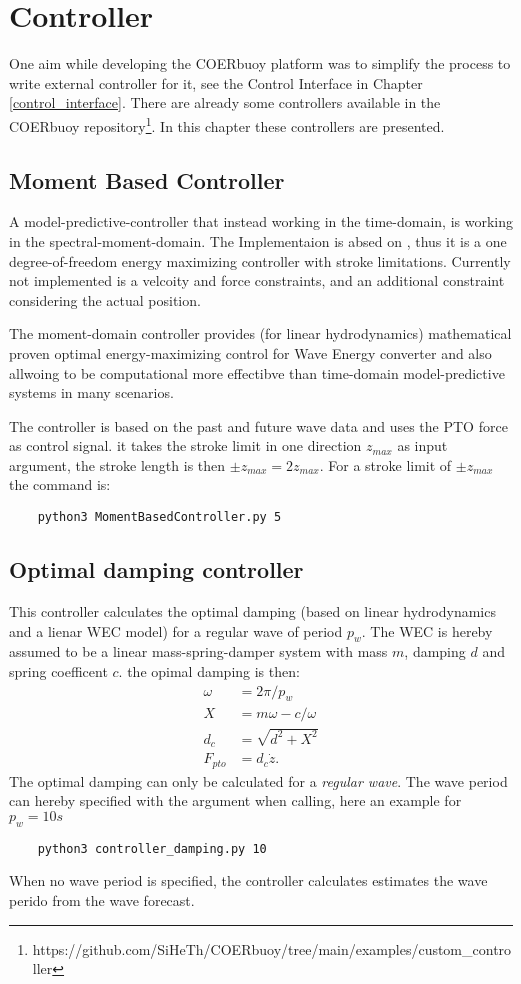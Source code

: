 \documentclass[oneside,10pt,a4paper]{book}
\begin{document}
\section{Controller}
One aim while developing the COERbuoy platform was to simplify the process to write external controller for it, see the Control Interface in Chapter \ref{control_interface}. There are already some controllers available in the COERbuoy repository\footnote{https://github.com/SiHeTh/COERbuoy/tree/main/examples/custom\_controller}. In this chapter these controllers are presented.
\subsection{Moment Based Controller}
A model-predictive-controller that instead working in the time-domain, is working in the spectral-moment-domain. The Implementaion is absed on \cite{control_mbc_horizon}, thus it is a one degree-of-freedom energy maximizing controller with stroke limitations. Currently not implemented is a velcoity and force constraints, and an additional constraint considering the actual position.

The moment-domain controller provides (for linear hydrodynamics) mathematical proven optimal energy-maximizing control for Wave Energy converter and also allwoing to be computational more effectibve than time-domain model-predictive systems in many scenarios.

The controller is based on the past and future wave data and uses the PTO force as control signal. it takes the stroke limit in one direction $z_{max}$ as input argument, the stroke length is then $\pm z_{max}=2z_{max}$. For a stroke limit of $\pm z_{max}$ the command is:
\begin{verbatim}
	python3 MomentBasedController.py 5
\end{verbatim}
\subsection{Optimal damping controller}
This controller calculates the optimal damping (based on linear hydrodynamics and a lienar WEC model) for a regular wave of period $p_w$. The WEC is hereby assumed to be a linear mass-spring-damper system with mass $m$, damping $d$ and spring coefficent $c$. the opimal damping is then:
\begin{align*}
	\omega&=2\pi/p_w\\
	X&=m\omega-c/\omega\\
	d_c&=\sqrt{d^2+X^2}\\
	F_{pto}&=d_c\dot{z}\text{.}
\end{align*}
The optimal damping can only be calculated for a \textit{regular wave}. The wave period can hereby specified with the argument when calling, here an example for $p_w=10 s$
\begin{verbatim}
	python3 controller_damping.py 10
\end{verbatim}
When no wave period is specified, the controller calculates estimates the wave perido from the wave forecast.
\end{document}
